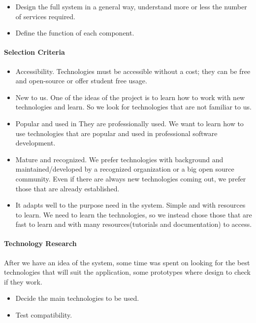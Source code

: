 \begin{itemize}
	\item Design the full system in a general way, understand more or less the number of services required.
	\item Define the function of each component.
	
\end{itemize}

\paragraph{Selection Criteria}

\begin{itemize}
	

\item Accessibility. Technologies must be accessible without a cost; they can be free and open-source or offer student free usage.
\item New to us. One of the ideas of the project is to learn how to work with new technologies and learn. So we look for technologies that are not familiar to us.

\item Popular and used in 
They are professionally used. We want to learn how to use technologies that are popular and used in professional software development.

\item Mature and recognized. We prefer technologies with background and maintained/developed by a recognized organization or a big open source community. Even if there are always new technologies coming out, we prefer those that are already established.

\item It adapts well to the purpose need in the system.
Simple and with resources to learn. We need to learn the technologies, so we instead chose those that are fast to learn and with many resources(tutorials and documentation) to access.
\end{itemize}
\paragraph{Technology Research}

After we have an idea of the system, some time was spent on looking for the best technologies that will suit the application, some prototypes where design to check if they work.

\begin{itemize}
	\item Decide the main technologies to be used.
	\item	Test compatibility. 
\end{itemize}




